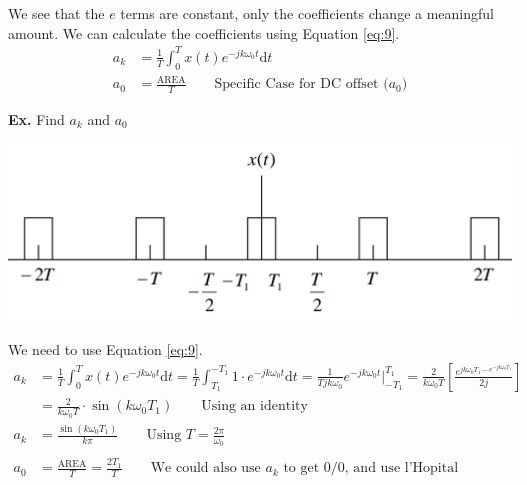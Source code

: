 \documentclass[12pt,letterpaper]{article} \usepackage{amsmath} \usepackage{graphicx} \usepackage[margin=1in]{geometry} \usepackage{longtable}  \usepackage{amssymb}
\begin{document}
	We see that the $e$ terms are constant, only the coefficients change a meaningful amount. We can calculate the coefficients using Equation \ref{eq:9}.
	\begin{align}
		a_k &= \frac{1}{T}\int^T_0 x(t)e^{-jk\omega_0 t}\mathrm d t\label{eq:9}\\
		a_0 &= \frac{\text{AREA}}{T} \qquad \text{Specific Case for DC offset ($a_0$)}
	\end{align}
	
	\begin{mdframed}
		\textbf{Ex.} Find $a_k$ and $a_0$
		
		\centering
		
		\includegraphics[width=0.7\linewidth]{images/ex2}
		
		\raggedright
		We need to use Equation \ref{eq:9}.
		\begin{align*}
			a_k &= \frac{1}{T}\int^T_0 x(t)e^{-jk\omega_0 t}\mathrm d t = \frac{1}{T}\int^{-T_1}_{T_1} 1\cdot e^{-jk\omega_0 t}\mathrm d t = \frac{1}{Tjk\omega_0}e^{-jk\omega_0 t}|^{T_1}_{-T_1} = \frac{2}{k\omega_0 T}\left[\frac{e^{jk\omega_0 T_1 - e^{-jk\omega_0 T_1}}}{2j}\right]\\
			&= \frac{2}{k\omega_0T}\cdot \sin(k\omega_0T_1) \qquad \text{Using an identity} \\
			a_k&= \frac{\sin(k\omega_0 T_1)}{k\pi} \qquad \text{Using $T = \frac{2\pi}{\omega_0}$}\\
			\\
			a_0 &= \frac{\text{AREA}}{T} = \frac{2T_1}{T} \qquad \text{We could also use $a_k$ to get 0/0, and use l'Hopital}
		\end{align*}
		
	\end{mdframed}
	
\end{document}
